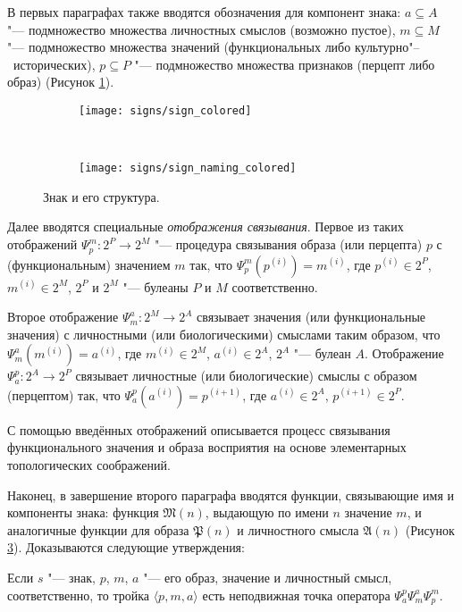 В первых параграфах также вводятся обозначения для компонент знака:  $a\subseteq A$ "--- подмножество множества личностных смыслов (возможно пустое), $m\subseteq M$ "--- подмножество множества значений (функциональных либо культурно"--~исторических), $p\subseteq P$ "--- подмножество множества признаков (перцепт либо образ) (Рисунок \ref{fg:sign}).
\begin{figure}[h]
	\centering
	\begin{subfigure}[b]{0.45\textwidth}
		\texttt{[image: signs/sign\_colored]}
		\caption{}
		\label{fg:sign}
	\end{subfigure}
	~
	\begin{subfigure}[b]{0.45\textwidth}
		\texttt{[image: signs/sign\_naming\_colored]}
		\caption{}
		\label{fg:sign_naming}
	\end{subfigure}
	\caption{Знак и его структура.}
\end{figure}

Далее вводятся специальные \textit{отображения связывания}. Первое из таких отображений $\Psi_p^m:2^P\rightarrow 2^M$ "--- процедура связывания образа (или перцепта) $p$ с (функциональным) значением $m$ так, что $\Psi_p^m(p^{(i)})=m^{(i)}$, где $p^{(i)}\in 2^P$, $m^{(i)}\in 2^M$, $2^P$ и $2^M$ "--- булеаны $P$ и $M$ соответственно.

Второе отображение $\Psi_m^a:2^M\rightarrow 2^A$ связывает значения (или функциональные значения) с личностными (или биологическими) смыслами таким образом, что $\Psi_m^a(m^{(i)})=a^{(i)}$, где $m^{(i)}\in 2^M$, $a^{(i)}\in 2^A$, $2^A$ "--- булеан $A$. Отображение $\Psi_a^p:2^A\rightarrow 2^P$ связывает личностные (или биологические) смыслы с образом (перцептом) так, что $\Psi_a^p(a^{(i)})=p^{(i+1)}$, где $a^{(i)}\in 2^A$, $p^{(i+1)}\in 2^P$.

С помощью введённых отображений описывается процесс связывания функционального значения и образа восприятия на основе элементарных топологических соображений.

Наконец, в завершение второго параграфа вводятся функции, связывающие имя и компоненты знака: функция $\mathfrak M(n)$, выдающую по имени $n$ значение $m$, и аналогичные функции для образа $\mathfrak P(n)$ и личностного смысла $\mathfrak A(n)$ (Рисунок \ref{fg:sign_naming}). Доказываются следующие утверждения:

\begin{Pred}
	\label{pred:fixed_point}
	Если $s$ "--- знак, $p$, $m$, $a$ "--- его образ, значение и личностный смысл, соответственно, то тройка $\langle p,m,a\rangle$ есть неподвижная точка оператора $\Psi_a^p\Psi_m^a\Psi_p^m$.
\end{Pred}

